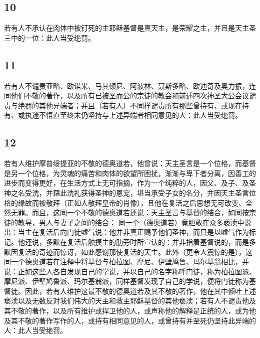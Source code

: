 
\subsection{10}

若有人不承认在肉体中被钉死的主耶稣基督是真天主，是荣耀之主，并且是天主圣三中的一位：此人当受绝罚。\par


\subsection{11}

若有人不谴责亚略、欧诺米、马其顿尼、阿波林、聂斯多略、欧迪奇及奥力振，连同他们不敬的著作，以及所有已被圣而公的宗徒的教会和前述四次神圣大公会议谴责与绝罚的其他异端者；并且（若有人）不同样谴责所有那些曾持有、或现在持有、或执迷不悟直至终末仍坚持与上述异端者相同意见的人：此人当受绝罚。\par


\subsection{12}

若有人维护摩普绥提亚的不敬的德奥道若，他曾说：天主圣言是一个位格，而基督是另一个位格，为灵魂的痛苦和肉体的欲望所困扰，渐渐与卑下者分离，因善工的进步而变得更好，在生活方式上无可指摘，作为一个纯粹的人，因父、及子、及圣神之名受洗，并藉此洗礼获得圣神的恩宠，堪当承受子女的名分，并因天主圣言位格的缘故而被敬拜（正如人敬拜皇帝的肖像），且他在复活之后思想无可改变、全然无罪。而且，这同一个不敬的德奥道若还说：天主圣言与基督的结合，如同按宗徒的教导，男人与妻子之间的结合： 同一个（德奥道若）竟胆敢在众多亵渎中说出：当主在复活后向门徒嘘气说：他并非真正赐予他们圣神，而只是以嘘气作为标记。他还说，多默在复活后触摸主的肋旁时所宣认的：并非指着基督说的，而是多默因复活的奇迹而惊讶，如此感谢那使复活的天主。此外（更令人震惊的是），这同一个德奥道若在注释中将基督与柏拉图、摩尼、伊壁鸠鲁、玛尔基翁相比，并说：正如这些人各自发现自己的学说，并以自己的名字称呼门徒，称为柏拉图派、摩尼派、伊壁鸠鲁派、玛尔基翁派，同样基督发现了自己的学说，便将门徒称为基督徒。因此，若有人维护这最不敬的德奥道若及其不敬的著作，他在其中倾吐上述亵渎以及无数反对我们伟大的天主和救主耶稣基督的其他亵渎；若有人不谴责他及其不敬的著作，以及所有维护或捍卫他的人，或声称他的解释是正统的人，或为他及其不敬的著作写作的人，或持有相同意见的人，或曾持有并至死仍坚持此异端的人：此人当受绝罚。\par

